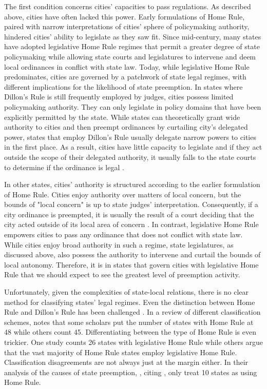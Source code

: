 \documentclass[12pt]{article}
\begin{document}
The first condition concerns cities' capacities to pass regulations. As described above, cities have often lacked this power. Early formulations of Home Rule, paired with narrow interpretations of cities' sphere of policymaking authority, hindered cities' ability to legislate as they saw fit. Since mid-century, many states have adopted legislative Home Rule regimes that permit a greater degree of state policymaking while allowing state courts and legislatures to intervene and deem local ordinances in conflict with state law. Today, while legislative Home Rule predominates, cities are governed by a patchwork of state legal regimes, with different implications for the likelihood of state preemption. In states where Dillon's Rule is still frequently employed by judges, cities possess limited policymaking authority. They can only legislate in policy domains that have been explicitly permitted by the state. While states can theoretically grant wide authority to cities and then preempt ordinances by curtailing city's delegated power, states that employ Dillon's Rule usually delegate narrow powers to cities in the first place. As a result, cities have little capacity to legislate and if they act outside the scope of their delegated authority, it usually falls to the state courts to determine if the ordinance is legal \parencite{dillerIntrastatePreemption2007}.

In other states, cities' authority is structured according to the earlier formulation of Home Rule. Cities enjoy authority over matters of local concern, but the bounds of "local concern" is up to state judges' interpretation. Consequently, if a city ordinance is preempted, it is usually the result of a court deciding that the city acted outside of its local area of concern \parencite{dillerIntrastatePreemption2007}. In contrast, legislative Home Rule empowers cities to pass any ordinance that does not conflict with state law. While cities enjoy broad authority in such a regime, state legislatures, as discussed above, also possess the authority to intervene and curtail the bounds of local autonomy. Therefore, it is in states that govern cities with legislative Home Rule that we should expect to see the greatest level of preemption activity. 

Unfortunately, given the complexities of state-local relations, there is no clear method for classifying states' legal regimes. Even the distinction between Home Rule and Dillon's Rule has been challenged \parencite{richardsonDillonRuleMars2011}. In a review of different classification schemes, \textcite{dillerIntrastatePreemption2007} notes that some scholars put the number of states with Home Rule at 48 while others count 45. Differentiating between the type of Home Rule is even trickier. One study counts 26 states with legislative Home Rule while others argue that the vast majority of Home Rule states employ legislative Home Rule. Classification disagreements are not always just at the margin either. In their analysis of the causes of state preemption, \textcite{fowlerStatePreemptionLocal2019}, citing \textcite{kraneHomeRuleAmerica2000}, only treat 10 states as using Home Rule. 
\end{document}
